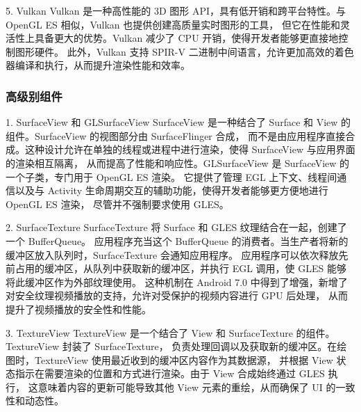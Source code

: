 5. Vulkan
Vulkan 是一种高性能的 3D 图形 API，具有低开销和跨平台特性。与 OpenGL ES 相似，Vulkan 也提供创建高质量实时图形的工具，
但它在性能和灵活性上具备更大的优势。Vulkan 减少了 CPU 开销，使得开发者能够更直接地控制图形硬件。
此外，Vulkan 支持 SPIR-V 二进制中间语言，允许更加高效的着色器编译和执行，从而提升渲染性能和效率。

\subsubsection{高级别组件}

1. SurfaceView 和 GLSurfaceView
SurfaceView 是一种结合了 Surface 和 View 的组件。SurfaceView 的视图部分由 SurfaceFlinger 合成，
而不是由应用程序直接合成。这种设计允许在单独的线程或进程中进行渲染，使得 SurfaceView 与应用界面的渲染相互隔离，
从而提高了性能和响应性。GLSurfaceView 是 SurfaceView 的一个子类，专门用于 OpenGL ES 渲染。
它提供了管理 EGL 上下文、线程间通信以及与 Activity 生命周期交互的辅助功能，使得开发者能够更方便地进行 OpenGL ES 渲染，
尽管并不强制要求使用 GLES。

2. SurfaceTexture
SurfaceTexture 将 Surface 和 GLES 纹理结合在一起，创建了一个 BufferQueue。
应用程序充当这个 BufferQueue 的消费者。当生产者将新的缓冲区放入队列时，SurfaceTexture 会通知应用程序。
应用程序可以依次释放先前占用的缓冲区，从队列中获取新的缓冲区，并执行 EGL 调用，使 GLES 能够将此缓冲区作为外部纹理使用。
这种机制在 Android 7.0 中得到了增强，新增了对安全纹理视频播放的支持，允许对受保护的视频内容进行 GPU 后处理，
从而提升了视频播放的安全性和性能。

3. TextureView
TextureView 是一个结合了 View 和 SurfaceTexture 的组件。TextureView 封装了 SurfaceTexture，
负责处理回调以及获取新的缓冲区。在绘图时，TextureView 使用最近收到的缓冲区内容作为其数据源，
并根据 View 状态指示在需要渲染的位置和方式进行渲染。由于 View 合成始终通过 GLES 执行，
这意味着内容的更新可能导致其他 View 元素的重绘，从而确保了 UI 的一致性和动态性。


